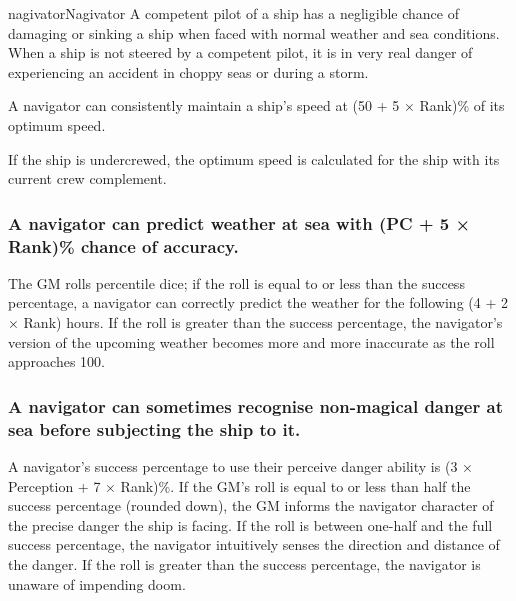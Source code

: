 \begin{Skill}[1.1]{nagivator}{Nagivator}
A competent pilot of a ship has a negligible chance of damaging or
sinking a ship when faced with normal weather and sea conditions.
When a ship is not steered by a competent pilot, it is in very real
danger of experiencing an accident in choppy seas or during a storm.

A navigator can consistently maintain a ship’s speed at (50 + 5 ×
Rank)\% of its optimum speed.

If the ship is undercrewed, the optimum speed is calculated for the
ship with its current crew complement.

\subsubsection{A navigator can predict weather at sea with (PC + 5 × Rank)\% chance of accuracy.}

The GM rolls percentile dice; if the roll is equal to or less than the
success percentage, a navigator can correctly predict the weather for
the following (4 + 2 × Rank) hours. If the roll is greater than the
success percentage, the navigator’s version of the upcoming weather
becomes more and more inaccurate as the roll approaches 100.

\subsubsection{A navigator can sometimes recognise non-magical danger at sea before
subjecting the ship to it.}

A navigator’s success percentage to use their perceive danger ability
is (3 × Perception + 7 × Rank)\%.  If the GM’s roll is equal to or
less than half the success percentage (rounded down), the GM informs
the navigator character of the precise danger the ship is facing. If
the roll is between one-half and the full success percentage, the
navigator intuitively senses the direction and distance of the danger.
If the roll is greater than the success percentage, the navigator is
unaware of impending doom.

\end{Skill}
